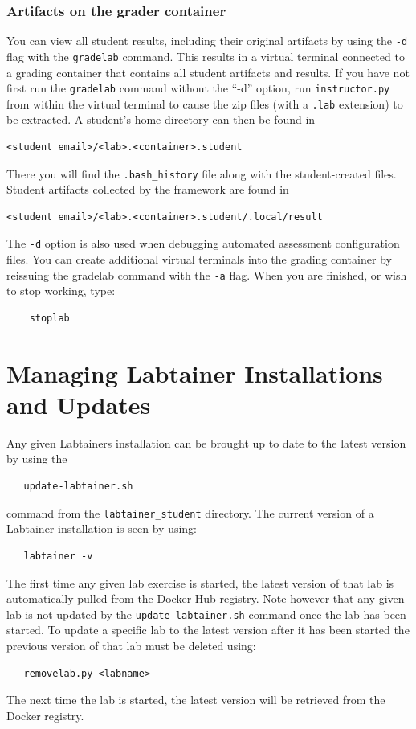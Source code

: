 \documentclass[12pt]{article}
\begin{document}
\subsubsection{Artifacts on the grader container}
You can view all student results, including their original artifacts by using the {\tt -d} flag
with the {\tt gradelab} command.  This results in a virtual terminal connected to a grading
container that contains all student artifacts and results.  If you have not first run the
{\tt gradelab} command without the ``-d'' option, run {\tt instructor.py} from within the
virtual terminal to cause the zip files (with a {\tt .lab} extension) to be extracted.  A student's home directory can
then be found in
\begin{verbatim}
<student email>/<lab>.<container>.student
\end{verbatim}
\noindent There you will find the {\tt .bash\_history} file along with the student-created files.
Student artifacts collected by the framework are found in 
\begin{verbatim}
<student email>/<lab>.<container>.student/.local/result
\end{verbatim}

\noindent The {\tt -d} option is also used when debugging automated assessment configuration
files.  You can create additional virtual terminals into the grading container by reissuing
the gradelab command with the {\tt -a} flag.  When you are finished, or wish to stop working, type:
\begin{verbatim}
    stoplab
\end{verbatim}


\section{Managing Labtainer Installations and Updates}
Any given Labtainers installation can be brought up to date to the latest version by using the
\begin{verbatim}
   update-labtainer.sh
\end{verbatim}
\noindent command from the {\tt labtainer_student} directory.  The current version of a Labtainer installation is seen by using:
\begin{verbatim}
   labtainer -v
\end{verbatim}
\noindent
The first time any given lab exercise is started, the latest version of that lab is automatically pulled from
the Docker Hub registry.
Note however that any given lab is not updated by the {\tt update-labtainer.sh} command once the lab has been started.  
To update a specific lab to the latest version after it has been started the previous version of that lab must be deleted
using:
\begin{verbatim}
   removelab.py <labname>
\end{verbatim}
\noindent The next time the lab is started, the latest version will be retrieved from the Docker registry.
\end{document}
